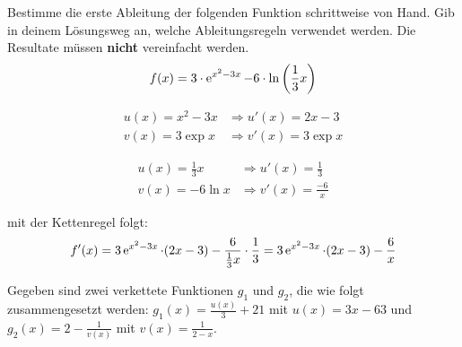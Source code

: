 \documentclass[11pt]{exam}
\begin{document}
\newpage
\begin{questions}
\question[2]
Bestimme die erste Ableitung der folgenden Funktion schrittweise von Hand. Gib in deinem Lösungsweg an, welche Ableitungsregeln verwendet werden. Die Resultate müssen \textbf{nicht} vereinfacht werden. \[f(x)=3\*\exp{x^2-3x}-6\*\ln{\frac{1}{3}x}\]
{\vspace{-1cm}\begin{solution}
	\begin{minipage}{0.475\linewidth}
		\begin{align*}
			u(x)=x^2-3x &\Rightarrow u'(x)=2x-3\\
			v(x)=3\exp{x} &\Rightarrow v'(x)=3\exp{x}
		\end{align*}
	\end{minipage}
	\hfill
	\begin{minipage}{0.475\linewidth}
		\begin{align*}
			u(x)=\frac{1}{3}x &\Rightarrow u'(x)=\frac{1}{3}\\
			v(x)=-6\ln{x} &\Rightarrow v'(x)=\frac{-6}{x}
		\end{align*}
	\end{minipage}
	mit der Kettenregel folgt: \[f'(x)=3\operatorname{\operatorname{e}}^{x^2-3x}\cdot(2x-3)-\frac{6}{\frac{1}{3}x}\cdot\frac{1}{3}=3\operatorname{\operatorname{e}}^{x^2-3x}\cdot(2x-3)-\frac{6}{x}\]
\end{solution}}
{}

\noaddpoints
\question[\totalpoints]
\addpoints
Gegeben sind zwei verkettete Funktionen $g_1$ und $g_2$, die wie folgt zusammengesetzt werden: $g_1(x)=\frac{u(x)}{3}+21$ mit $u(x)=3x-63$ und $g_2(x)=2-\frac{1}{v(x)}$ mit $v(x)=\frac{1}{2-x}$.
\end{questions}
\end{document}
